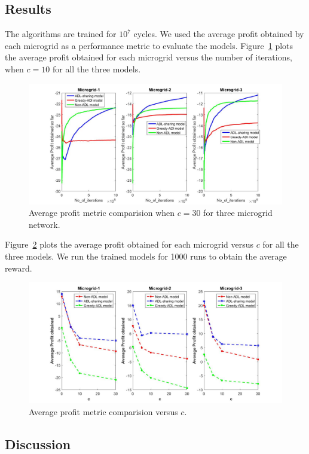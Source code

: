 \subsection{Results}
The algorithms are trained for $10^7$ cycles. We used the average profit obtained by each microgrid as a performance metric to evaluate the models. Figure~\ref{r2} plots the average profit obtained for each microgrid versus the number of iterations, when $c = 10$ for all the three models. 
\begin{figure}[thbp]
	\centering
	\includegraphics[scale = 0.2]{second_plot.jpg}
	\caption{Average profit metric comparision when $c = 30$ for three microgrid network.}
        \label{r2}
\end{figure}

Figure~\ref{r1} plots the average profit obtained for each microgrid versus $c$ for all the three models. We run the trained models for 1000 runs to obtain the average reward. 
\begin{figure}[thbp]
	\centering
	\includegraphics[scale = 0.2]{first_plot.jpg}
	\caption{Average profit metric comparision versus $c$.}
	 \label{r1}
\end{figure}
\subsection{Discussion}

